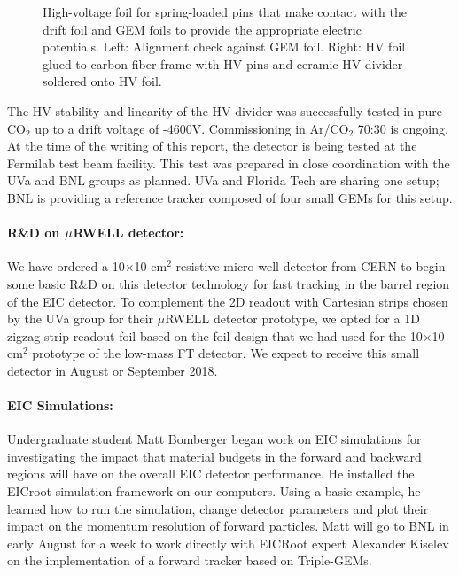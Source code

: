 \begin{figure}
	\centering
	\caption{\label{fig:HV_foil}High-voltage foil for spring-loaded pins that make contact with the drift foil and GEM foils to provide the appropriate electric potentials. Left: Alignment check against GEM foil. Right: HV foil glued to carbon fiber frame with HV pins and ceramic HV divider soldered onto HV foil.}	
\end{figure}

The HV stability and linearity of the HV divider was successfully tested in pure CO$_2$ up to a drift voltage of -4600V. Commissioning in Ar/CO$_2$ 70:30 is ongoing. At the time of the writing of this report, the detector is being tested at the Fermilab test beam facility. This test was prepared in close coordination with the UVa and BNL groups as planned. UVa and Florida Tech are sharing one setup; BNL is providing a reference tracker composed of four small GEMs for this setup.

\paragraph*{R\&D on $\boldmath{\mu}$RWELL detector:} We have ordered a 10$\times$10 cm$^2$ resistive micro-well detector from CERN to begin some basic R\&D on this detector technology for fast tracking in the barrel region of the EIC detector. To complement the 2D readout with Cartesian strips chosen by the UVa group for their $\mu$RWELL detector prototype, we opted for a 1D zigzag strip readout foil based on the foil design that we had used for the 10$\times$10 cm$^2$ prototype\cite{Zhang:2017dqw} of the low-mass FT detector. We expect to receive this small detector in August or September 2018.

\paragraph*{EIC Simulations:} Undergraduate student Matt Bomberger began work on EIC simulations for investigating the impact that material budgets in the forward and backward regions will have on the overall EIC detector performance. He installed the EICroot simulation framework on our computers. Using a basic example, he learned how to run the simulation, change detector parameters and plot their impact on the momentum resolution of forward particles. Matt will go to BNL in early August for a week to work directly with EICRoot expert Alexander Kiselev on the implementation of a forward tracker based on Triple-GEMs.

